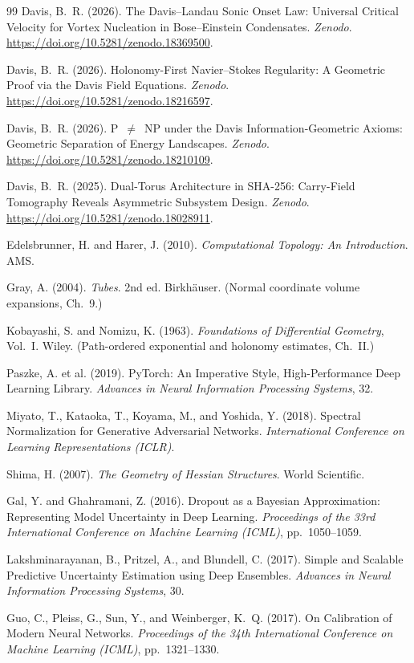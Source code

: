 \documentclass[11pt,a4paper]{article}
\theoremstyle{definition}
\theoremstyle{remark}
\begin{document}
\begin{thebibliography}{99}
 Davis, B.~R. (2026). The Davis--Landau 
Sonic Onset Law: Universal Critical Velocity for Vortex Nucleation 
in Bose--Einstein Condensates. \emph{Zenodo}. 
\url{https://doi.org/10.5281/zenodo.18369500}.

 Davis, B.~R. (2026). 
Holonomy-First Navier--Stokes Regularity: A Geometric Proof via 
the Davis Field Equations. \emph{Zenodo}. 
\url{https://doi.org/10.5281/zenodo.18216597}.

 Davis, B.~R. (2026). P~$\neq$~NP under the 
Davis Information-Geometric Axioms: Geometric Separation of Energy 
Landscapes. \emph{Zenodo}. 
\url{https://doi.org/10.5281/zenodo.18210109}.

 Davis, B.~R. (2025). Dual-Torus 
Architecture in SHA-256: Carry-Field Tomography Reveals 
Asymmetric Subsystem Design. \emph{Zenodo}. 
\url{https://doi.org/10.5281/zenodo.18028911}.

 Edelsbrunner, H. and Harer, J. (2010). 
\emph{Computational Topology: An Introduction}. AMS.

 Gray, A. (2004). \emph{Tubes}. 2nd ed. 
Birkh\"auser. (Normal coordinate volume expansions, Ch.~9.)

 Kobayashi, S. and Nomizu, K. (1963). 
\emph{Foundations of Differential Geometry}, Vol.~I. Wiley. 
(Path-ordered exponential and holonomy estimates, Ch.~II.)

 Paszke, A. et al. (2019). PyTorch: An 
Imperative Style, High-Performance Deep Learning Library. 
\emph{Advances in Neural Information Processing Systems}, 32.

 Miyato, T., Kataoka, T., 
Koyama, M., and Yoshida, Y. (2018). Spectral Normalization 
for Generative Adversarial Networks. \emph{International 
Conference on Learning Representations (ICLR)}.

 Shima, H. (2007). \emph{The Geometry of 
Hessian Structures}. World Scientific.

 Gal, Y. and Ghahramani, Z. (2016). 
Dropout as a Bayesian Approximation: Representing Model 
Uncertainty in Deep Learning. \emph{Proceedings of the 33rd 
International Conference on Machine Learning (ICML)}, 
pp.~1050--1059.

 Lakshminarayanan, B., 
Pritzel, A., and Blundell, C. (2017). Simple and Scalable 
Predictive Uncertainty Estimation using Deep Ensembles. 
\emph{Advances in Neural Information Processing Systems}, 30.

 Guo, C., Pleiss, G., Sun, Y., 
and Weinberger, K.~Q. (2017). On Calibration of Modern Neural 
Networks. \emph{Proceedings of the 34th International Conference 
on Machine Learning (ICML)}, pp.~1321--1330.
\end{thebibliography}
\end{document}
